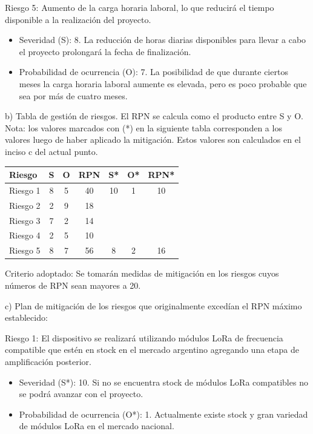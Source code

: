 \documentclass[
11pt, %
codirector, %
]{charter}
\begin{document}
Riesgo 5: Aumento de la carga horaria laboral, lo que reducirá el tiempo disponible a la realización del proyecto.
\begin{itemize}
	\item Severidad (S): 8. La reducción de horas diarias disponibles para llevar a cabo el proyecto prolongará la fecha de finalización.
	\item Probabilidad de ocurrencia (O): 7. La posibilidad de que durante ciertos meses la carga horaria laboral aumente es elevada, pero es poco probable que sea por más de cuatro meses.
\end{itemize} 





b) Tabla de gestión de riesgos. El RPN se calcula como el producto entre S y O.\\
Nota: los valores marcados con (*) en la siguiente tabla corresponden a los valores luego de haber aplicado la mitigación. Estos valores son calculados en el inciso c del actual punto.

\begin{table}[htpb]
\centering
\begin{tabularx}{\linewidth}{@{}|X|c|c|c|c|c|c|@{}}
\hline
\rowcolor[HTML]{C0C0C0} 
Riesgo  & S & O & RPN & S* & O* & RPN* \\ \hline
Riesgo 1& 8 & 5 &  40 & 10 &  1 &  10  \\ \hline
Riesgo 2& 2 & 9 &  18 &    &    &      \\ \hline
Riesgo 3& 7 & 2 &  14 &    &    &      \\ \hline
Riesgo 4& 2 & 5 &  10 &    &    &      \\ \hline
Riesgo 5& 8 & 7 &  56 &  8 &  2 &  16  \\ \hline
\end{tabularx}%
\end{table}

Criterio adoptado: 
Se tomarán medidas de mitigación en los riesgos cuyos números de RPN sean mayores a 20.

c) Plan de mitigación de los riesgos que originalmente excedían el RPN máximo establecido:
 
Riesgo 1: El dispositivo se realizará utilizando módulos LoRa de frecuencia compatible que estén en stock en el mercado argentino agregando una etapa de amplificación posterior.
\begin{itemize}
	\item Severidad (S*): 10. Si no se encuentra stock de módulos LoRa compatibles no se podrá avanzar con el proyecto.
	\item Probabilidad de ocurrencia (O*): 1. Actualmente existe stock y gran variedad de módulos LoRa en el mercado nacional.
\end{itemize} 
\end{document}
